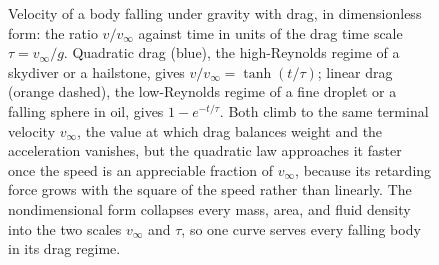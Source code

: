 \begin{figure}[htbp]
\centering
{}
\caption[Approach to terminal velocity under quadratic drag]{Velocity
of a body falling under gravity with drag, in dimensionless form: the
ratio $v/v_\infty$ against time in units of the drag time scale
$\tau=v_\infty/g$. Quadratic drag (blue), the high-Reynolds regime of a
skydiver or a hailstone, gives $v/v_\infty=\tanh(t/\tau)$; linear drag
(orange dashed), the low-Reynolds regime of a fine droplet or a
falling sphere in oil, gives $1-e^{-t/\tau}$. Both climb to the same
terminal velocity $v_\infty$, the value at which drag balances weight
and the acceleration vanishes, but the quadratic law approaches it
faster once the speed is an appreciable fraction of $v_\infty$, because
its retarding force grows with the square of the speed rather than
linearly. The nondimensional form collapses every mass, area, and
fluid density into the two scales $v_\infty$ and $\tau$, so one curve
serves every falling body in its drag regime.}
\label{fig:vol02:ch07:terminal-velocity}
\end{figure}

